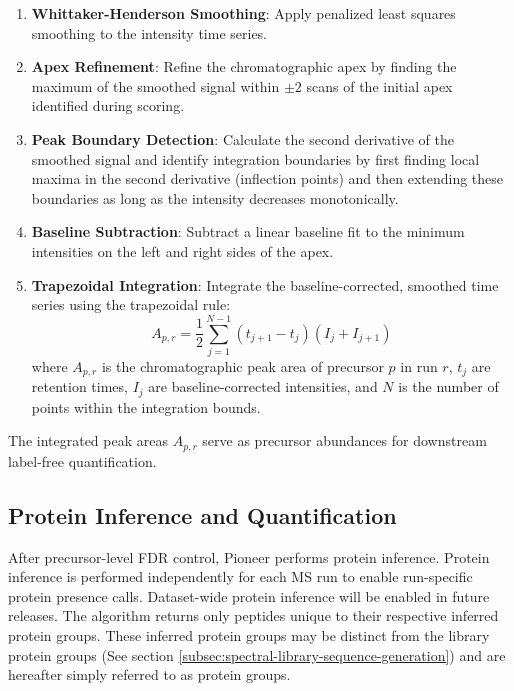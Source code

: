 \documentclass[pdflatex,sn-nature]{sn-jnl}
\begin{document}
\begin{enumerate}
    \item \textbf{Whittaker-Henderson Smoothing}: Apply penalized least squares smoothing \cite{Biessy2023-ix} to the intensity time series.

    \item \textbf{Apex Refinement}: Refine the chromatographic apex by finding the maximum of the smoothed signal within $\pm 2$ scans of the initial apex identified during scoring.

    \item \textbf{Peak Boundary Detection}: Calculate the second derivative of the smoothed signal and identify integration boundaries by first finding local maxima in the second derivative (inflection points) and then extending these boundaries as long as the intensity decreases monotonically.

    \item \textbf{Baseline Subtraction}: Subtract a linear baseline fit to the minimum intensities on the left and right sides of the apex.

    \item \textbf{Trapezoidal Integration}: Integrate the baseline-corrected, smoothed time series using the trapezoidal rule:
    \begin{equation}
        A_{p,r} = \frac{1}{2}\sum_{j=1}^{N-1} (t_{j+1} - t_j)(I_j + I_{j+1})
    \end{equation}
    where $A_{p,r}$ is the chromatographic peak area of precursor $p$ in run $r$, $t_j$ are retention times, $I_j$ are baseline-corrected intensities, and $N$ is the number of points within the integration bounds.
\end{enumerate}

The integrated peak areas $A_{p,r}$ serve as precursor abundances for downstream label-free quantification.



\subsection{Protein Inference and Quantification}\label{subsec:protein_inference}

After precursor-level FDR control, Pioneer performs protein inference. Protein inference is performed independently for each MS run to enable run-specific protein presence calls. Dataset-wide protein inference will be enabled in future releases. The algorithm returns only peptides unique to their respective inferred protein groups. These inferred protein groups may be distinct from the library protein groups (See section \ref{subsec:spectral-library-sequence-generation}) and are hereafter simply referred to as protein groups.
\end{document}
